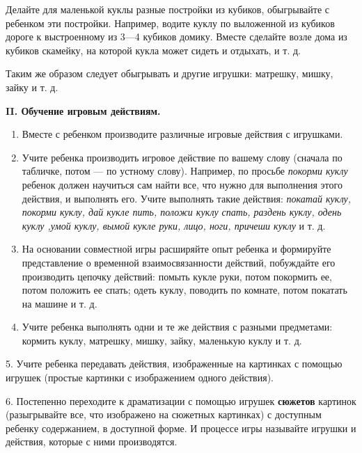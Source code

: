 \documentclass{book}
\renewcommand{\emph}[1]{\textit{#1}}
\begin{document}
Делайте для маленькой куклы разные постройки из кубиков, обыгрывайте с
ребенком эти постройки. Например, водите куклу по выложенной из кубиков
дороге к выстроенному из 3---4 кубиков домику. Вместе сделайте возле
дома из кубиков скамейку, на которой кукла может сидеть и отдыхать, и т.
д.

Таким же образом следует обыгрывать и другие игрушки: матрешку, мишку,
зайку и т. д.

\textbf{II. Обучение игровым действиям.}


\begin{enumerate}
\def\labelenumi{\arabic{enumi}.}
\item
  
  Вместе с ребенком производите различные игровые действия с игрушками.
  
\item
  
  Учите ребенка производить игровое действие по вашему слову (сначала по
  табличке, потом --- по устному слову). Например, по просьбе
  \emph{покорми куклу} ребенок должен научиться сам найти все, что нужно
  для выполнения этого действия, и выполнять его. Учите выполнять такие
  действия: \emph{покатай куклу, покорми куклу, дай кукле пить, положи
  куклу спать, раздень куклу, одень куклу ,умой куклу, вымой кукле руки,
  лицо, ноги, причеши куклу} и т. д.
  
\item
  
  На основании совместной игры расширяйте опыт ребенка и формируйте
  представление о временной взаимосвязанности действий, побуждайте его
  производить цепочку действий: помыть кукле руки, потом покормить ее,
  потом положить ее спать; одеть куклу, поводить по комнате, потом
  покатать на машине и т. д.
  
\item
  
  Учите ребенка выполнять одни и те же действия с разными предметами:
  кормить куклу, матрешку, мишку, зайку, маленькую куклу и т. д.
  
\end{enumerate}


5. Учите ребенка передавать действия, изображенные на картинках с
помощью игрушек (простые картинки с изображением одного действия).

6. Постепенно переходите к драматизации с помощью игрушек
\textbf{сюжетов} картинок (разыгрывайте все, что изображено на сюжетных
картинках) с доступным ребенку содержанием, в доступной форме. И
процессе игры называйте игрушки и действия, которые с ними производятся.
\end{document}
